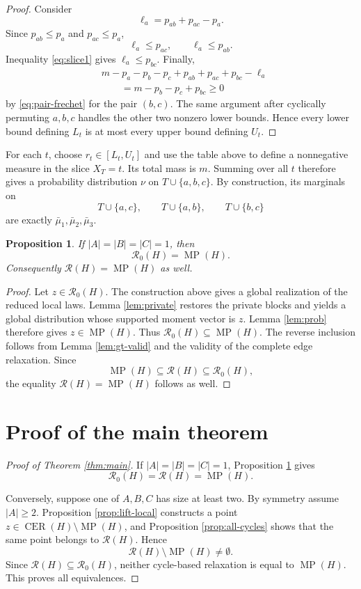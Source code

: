 \documentclass[11pt]{article}
\newtheorem{proposition}[theorem]{Proposition}
\theoremstyle{definition}
\theoremstyle{remark}
\newcommand{\MP}{\operatorname{MP}}
\newcommand{\CER}{\operatorname{CER}}
\newcommand{\Rdist}{\mathcal{R}_{0}}
\newcommand{\Rall}{\mathcal{R}}
\begin{document}
\begin{editedaiblock}
\begin{proof}
Consider
\[
\ell_a=p_{ab}+p_{ac}-p_a.
\]
Since $p_{ab}\le p_a$ and $p_{ac}\le p_a$,
\[
\ell_a\le p_{ac},\qquad \ell_a\le p_{ab}.
\]
Inequality \eqref{eq:slice1} gives $\ell_a\le p_{bc}$. Finally,
\[
\begin{aligned}
&m-p_a-p_b-p_c+p_{ab}+p_{ac}+p_{bc}-\ell_a\\
&\qquad =m-p_b-p_c+p_{bc}\ge0
\end{aligned}
\]
by \eqref{eq:pair-frechet} for the pair $(b,c)$. The same argument after cyclically permuting $a,b,c$ handles the other two nonzero lower bounds. Hence every lower bound defining $L_t$ is at most every upper bound defining $U_t$.
\end{proof}

For each $t$, choose $r_t\in[L_t,U_t]$ and use the table above to define a nonnegative measure in the slice $X_T=t$. Its total mass is $m$. Summing over all $t$ therefore gives a probability distribution $\nu$ on $T\cup\{a,b,c\}$. By construction, its marginals on
\[
T\cup\{a,c\},\qquad T\cup\{a,b\},\qquad T\cup\{b,c\}
\]
are exactly $\bar\mu_1,\bar\mu_2,\bar\mu_3$.

\begin{proposition}\label{prop:positive}
If $|A|=|B|=|C|=1$, then
\[
\Rdist(H)=\MP(H).
\]
Consequently $\Rall(H)=\MP(H)$ as well.
\end{proposition}

\begin{proof}
Let $z\in\Rdist(H)$. The construction above gives a global realization of the reduced local laws. Lemma \ref{lem:private} restores the private blocks and yields a global distribution whose supported moment vector is $z$. Lemma \ref{lem:prob} therefore gives $z\in\MP(H)$. Thus $\Rdist(H)\subseteq\MP(H)$. The reverse inclusion follows from Lemma \ref{lem:gt-valid} and the validity of the complete edge relaxation. Since
\[
\MP(H)\subseteq\Rall(H)\subseteq\Rdist(H),
\]
the equality $\Rall(H)=\MP(H)$ follows as well.
\end{proof}
\end{editedaiblock}

\section{Proof of the main theorem}
\begin{editedaiblock}
\begin{proof}[Proof of Theorem \ref{thm:main}]
If $|A|=|B|=|C|=1$, Proposition \ref{prop:positive} gives
\[
\Rdist(H)=\Rall(H)=\MP(H).
\]

Conversely, suppose one of $A,B,C$ has size at least two. By symmetry assume $|A|\ge2$. Proposition \ref{prop:lift-local} constructs a point $z\in\CER(H)\setminus\MP(H)$, and Proposition \ref{prop:all-cycles} shows that the same point belongs to $\Rall(H)$. Hence
\[
\Rall(H)\setminus\MP(H)\neq\emptyset.
\]
Since $\Rall(H)\subseteq\Rdist(H)$, neither cycle-based relaxation is equal to $\MP(H)$. This proves all equivalences.
\end{proof}
\end{editedaiblock}
\end{document}
